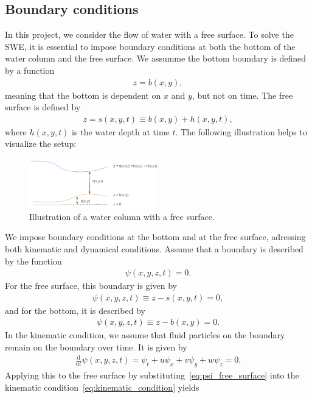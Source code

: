 \subsection{Boundary conditions}
In this project, we consider the flow of water with a free surface.
To solve the SWE, it is essential to impose boundary conditions at both the bottom of the water column and the free surface.
We assumme the bottom boundary is defined by a function
\begin{align*}
    z = b(x,y),
\end{align*}
meaning that the bottom is dependent on $x$ and $y$, but not on time.
The free surface is defined by 
\begin{align*}
    z = s(x,y,t) \equiv b(x,y) + h(x,y,t),
\end{align*}
where $h(x,y,t)$ is the water depth at time $t$.
The following illustration helps to visualize the setup:
\begin{figure}[H]
    \centering
    \includegraphics[width=0.5\textwidth]{figs/water-column-bc.png}
    \caption{Illustration of a water column with a free surface.}\label{fig:water_column_bc}
\end{figure}
We impose boundary conditions at the bottom and at the free surface, adressing both kinematic and dynamical conditions.
Assume that a boundary is described by the function 
\begin{align*}
    \psi(x,y,z,t) = 0.
\end{align*}
For the free surface, this boundary is given by
\begin{align}\label{eq:psi_free_surface}
    \psi(x,y,z,t) \equiv z - s(x,y,t) = 0,
\end{align}
and for the bottom, it is described by
\begin{align}\label{eq:psi_bottom}
    \psi(x,y,z,t) \equiv z - b(x,y) = 0.
\end{align}
In the kinematic condition, we assume that fluid particles on the boundary remain on the boundary over time.
It is given by
\begin{align}\label{eq:kinematic_condition}
    \frac{\text{d} }{\text{d} t} \psi(x,y,z,t) = \psi_t + u \psi_x + v \psi_y + w \psi_z = 0.
\end{align}
Applying this to the free surface by substituting~\eqref{eq:psi_free_surface} into the kinematic condition~\eqref{eq:kinematic_condition} yields
